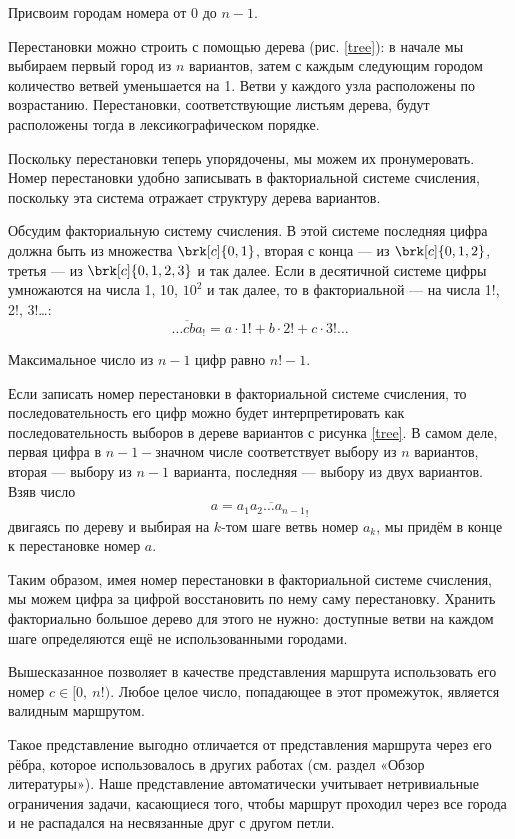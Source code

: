 Присвоим городам номера от 0 до $n-1$.

Перестановки можно строить с помощью дерева (рис. \ref{tree}): в начале мы выбираем первый город из $n$ вариантов, затем с каждым следующим городом количество ветвей уменьшается на 1. Ветви у каждого узла расположены по возрастанию. Перестановки, соответствующие листьям дерева, будут расположены тогда в лексикографическом порядке.


Поскольку перестановки теперь упорядочены, мы можем их пронумеровать. Номер перестановки удобно записывать в факториальной системе счисления, поскольку эта система отражает структуру дерева вариантов. 

Обсудим факториальную систему счисления. В этой системе последняя цифра должна быть из множества $\brk[c]{0, 1}$, вторая с конца --- из $\brk[c]{0, 1, 2}$, третья --- из $\brk[c]{0, 1, 2, 3}$ и так далее. Если в десятичной системе цифры умножаются на числа 1, 10, $10^2$ и так далее, то в факториальной --- на числа 1!, 2!, $3!$\dots:
$$
\overline{\dots cba}_! = a \cdot 1! + b \cdot 2! + c \cdot 3! \dots
$$

Максимальное число из $n-1$ цифр равно $n!-1$. 
 
Если записать номер перестановки в факториальной системе счисления, то последовательность его цифр можно будет интерпретировать как последовательность выборов в дереве вариантов с рисунка \ref{tree}. 
В самом деле, первая цифра в $n{-}1{-}$значном числе соответствует выбору из $n$ вариантов, вторая --- выбору из $n-1$ варианта, последняя --- выбору из двух вариантов. 
Взяв число 
$$a = \overline{a_1 a_2 \dots a_{n-1}}_!$$ 
двигаясь по дереву и выбирая на $k$-том шаге ветвь номер $a_k$, мы придём в конце к перестановке номер $a$.

Таким образом, имея номер перестановки в факториальной системе счисления, мы можем цифра за цифрой восстановить по нему саму перестановку. Хранить факториально большое дерево для этого не нужно: доступные ветви на каждом шаге определяются ещё не использованными городами.


Вышесказанное позволяет в качестве представления маршрута использовать его номер $c \in [0,\: n!)$. Любое целое число, попадающее в этот промежуток, является валидным маршрутом.

Такое представление выгодно отличается от представления маршрута через его рёбра, которое использовалось в других работах (см. раздел «Обзор литературы»). Наше представление автоматически учитывает нетривиальные ограничения задачи, касающиеся того, чтобы маршрут проходил через все города и не распадался на несвязанные друг с другом петли.

